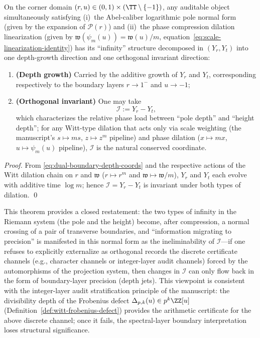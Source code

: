 \begin{theorem}\label{thm:dual-boundary-normal-form}
On the corner domain \((r,u)\in(0,1)\times(\TT\setminus\{-1\})\), any auditable object simultaneously satisfying (i)~the Abel-caliber logarithmic pole normal form (given by the expansion of \(\mathcal{P}(r)\)) and (ii)~the phase compression dilation linearization (given by \(\mathfrak{w}(\psi_m(u))=\mathfrak{w}(u)/m\), equation~\eqref{eq:scale-linearization-identity}) has its ``infinity'' structure decomposed in \((Y_r,Y_t)\) into one depth-growth direction and one orthogonal invariant direction:
\begin{enumerate}
  \item \textbf{(Depth growth)} Carried by the additive growth of \(Y_r\) and \(Y_t\), corresponding respectively to the boundary layers \(r\to 1^{-}\) and \(u\to -1\);
  \item \textbf{(Orthogonal invariant)} One may take
  \[
  \mathcal{I}:=Y_r-Y_t,
  \]
  which characterizes the relative phase load between ``pole depth'' and ``height depth''; for any Witt-type dilation that acts only via scale weighting (the manuscript's \(s\mapsto ms\), \(z\mapsto z^{m}\) pipeline) and phase dilation (\(x\mapsto mx\), \(u\mapsto\psi_m(u)\) pipeline), \(\mathcal{I}\) is the natural conserved coordinate.
\end{enumerate}
\end{theorem}
\begin{proof}
From \eqref{eq:dual-boundary-depth-coords} and the respective actions of the Witt dilation chain on \(r\) and \(\mathfrak{w}\) (\(r\mapsto r^{m}\) and \(\mathfrak{w}\mapsto \mathfrak{w}/m\)), \(Y_r\) and \(Y_t\) each evolve with additive time \(\log m\); hence \(\mathcal{I}=Y_r-Y_t\) is invariant under both types of dilation. \qed
\end{proof}
This theorem provides a closed restatement: the two types of infinity in the Riemann system (the pole and the height) become, after compression, a normal crossing of a pair of transverse boundaries, and ``information migrating to precision'' is manifested in this normal form as the ineliminability of \(\mathcal{I}\)---if one refuses to explicitly externalize as orthogonal records the discrete certificate channels (e.g., character channels or integer-layer audit channels) forced by the automorphisms of the projection system, then changes in \(\mathcal{I}\) can only flow back in the form of boundary-layer precision (depth jets). This viewpoint is consistent with the integer-layer audit stratification principle of the manuscript: the divisibility depth of the Frobenius defect \(\Delta_{p,k}(u)\in p^k\ZZ[u]\) (Definition~\ref{def:witt-frobenius-defect}) provides the arithmetic certificate for the above discrete channel; once it fails, the spectral-layer boundary interpretation loses structural significance.
